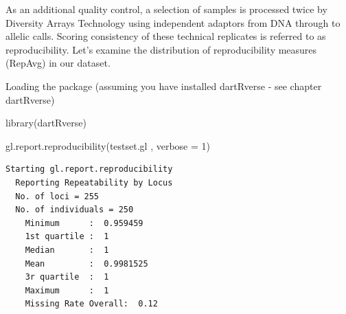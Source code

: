 \documentclass[
  letterpaper,
  DIV=11,
  numbers=noendperiod]{scrreprt}
\newenvironment{Shaded}{\begin{snugshade}}{\end{snugshade}}
\newcommand{\AttributeTok}[1]{\textcolor[rgb]{0.49,0.56,0.16}{#1}}
\newcommand{\DecValTok}[1]{\textcolor[rgb]{0.25,0.63,0.44}{#1}}
\newcommand{\FunctionTok}[1]{\textcolor[rgb]{0.02,0.16,0.49}{#1}}
\newcommand{\NormalTok}[1]{\textcolor[rgb]{0.00,0.44,0.13}{#1}}
\let\textttOrig\texttt
\renewcommand{\texttt}[1]{\textttOrig{\color{blue}{#1}}}
\begin{document}
As an additional quality control, a selection of samples is processed
twice by Diversity Arrays Technology using independent adaptors from DNA
through to allelic calls. Scoring consistency of these technical
replicates is referred to as reproducibility. Let's examine the
distribution of reproducibility measures (RepAvg) in our dataset.

Loading the package (assuming you have installed dartRverse - see
chapter dartRverse)

\begin{Shaded}
\begin{Highlighting}[]
\FunctionTok{library}\NormalTok{(dartRverse)}
\end{Highlighting}
\end{Shaded}

\begin{Shaded}
\begin{Highlighting}[]
\FunctionTok{gl.report.reproducibility}\NormalTok{(testset.gl , }\AttributeTok{verbose =} \DecValTok{1}\NormalTok{)}
\end{Highlighting}
\end{Shaded}

\begin{verbatim}
Starting gl.report.reproducibility 
  Reporting Repeatability by Locus
  No. of loci = 255 
  No. of individuals = 250 
    Minimum      :  0.959459 
    1st quartile :  1 
    Median       :  1 
    Mean         :  0.9981525 
    3r quartile  :  1 
    Maximum      :  1 
    Missing Rate Overall:  0.12 
\end{verbatim}

\begin{figure}[H]

{\centering \texttt{[image: basicfiltering\_files/figure-pdf/unnamed-chunk-2-1.pdf]}

}

\end{figure}
\end{document}
